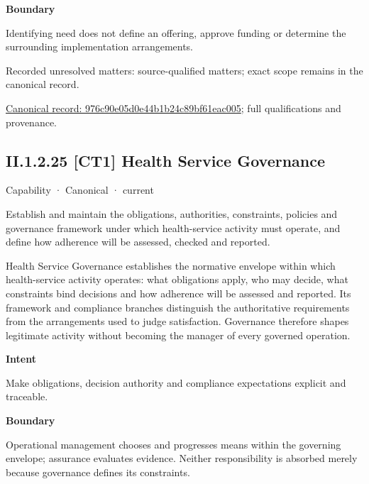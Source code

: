\textbf{Boundary}



Identifying need does not define an offering, approve funding or determine the surrounding implementation arrangements.


{\small Recorded unresolved matters: source-qualified matters; exact scope remains in the canonical record.}\par
{\footnotesize \href{../../../../continuum/strategy/capability/976c90e05d0e44b1b24c89bf61eac005.md}{Canonical record: 976c90e05d0e44b1b24c89bf61eac005}; full qualifications and provenance.}\par
\subsection*{II.1.2.25 [CT1] Health Service Governance}
\label{navigation:II.1.2.25}

\label{element:209aada781e844e28202a2535a264c21}
{\small Capability · Canonical · current}\par

Establish and maintain the obligations, authorities, constraints, policies and governance framework under which health-service activity must operate, and define how adherence will be assessed, checked and reported.



Health Service Governance establishes the normative envelope within which health-service activity operates: what obligations apply, who may decide, what constraints bind decisions and how adherence will be assessed and reported. Its framework and compliance branches distinguish the authoritative requirements from the arrangements used to judge satisfaction. Governance therefore shapes legitimate activity without becoming the manager of every governed operation.



\textbf{Intent}



Make obligations, decision authority and compliance expectations explicit and traceable.



\textbf{Boundary}



Operational management chooses and progresses means within the governing envelope; assurance evaluates evidence. Neither responsibility is absorbed merely because governance defines its constraints.



